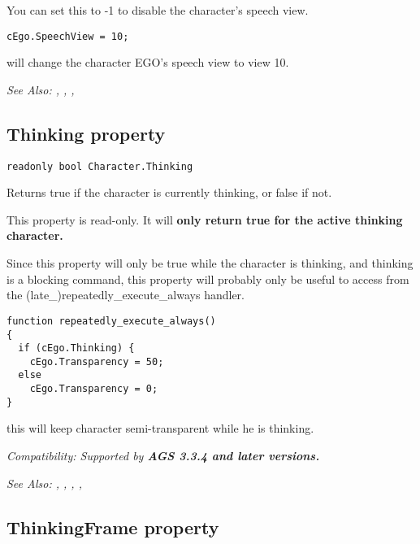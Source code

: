 You can set this to -1 to disable the character's speech view.

\begin{verbatim}
cEgo.SpeechView = 10;
\end{verbatim}
will change the character EGO's speech view to view 10.

\it{See Also:} ,
,
,


\subsection{Thinking property}\label{Character.Thinking}%

\begin{verbatim}
readonly bool Character.Thinking
\end{verbatim}
Returns true if the character is currently thinking, or false if not.

This property is read-only. It will \bf{only} return true for the active thinking character.

Since this property will only be true while the character is thinking, and thinking is
a blocking command, this property will probably only be useful to access from
the (late_)repeatedly_execute_always handler.

\begin{verbatim}
function repeatedly_execute_always()
{
  if (cEgo.Thinking) {
    cEgo.Transparency = 50;
  else
    cEgo.Transparency = 0;
}
\end{verbatim}
this will keep character semi-transparent while he is thinking.

\it{Compatibility:} Supported by \bf{AGS 3.3.4} and later versions.

\it{See Also:} ,
,
,
,


\subsection{ThinkingFrame property}\label{Character.ThinkingFrame}%

